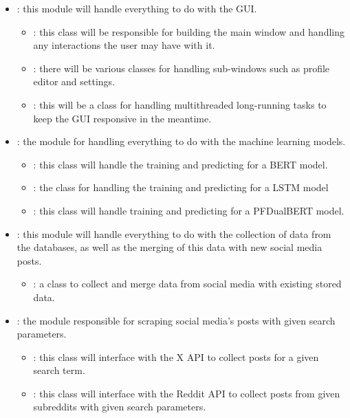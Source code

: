     \begin{itemize}
        \item {}: this module will handle everything to do with the GUI.
        \begin{itemize}
            \item {}: this class will be responsible for building the main window and handling any interactions the user may have with it.
            \item {}: there will be various classes for handling sub-windows such as profile editor and settings.
            \item {}: this will be a class for handling multithreaded long-running tasks to keep the GUI responsive in the meantime.
        \end{itemize}
        \item {}: the module for handling everything to do with the machine learning models.
        \begin{itemize}
            \item {}: this class will handle the training and predicting for a BERT model.
            \item {}: the class for handling the training and predicting for a LSTM model
            \item {}: this class will handle training and predicting for a PFDualBERT model. 
        \end{itemize}
        \item {}: this module will handle everything to do with the collection of data from the databases, as well as the merging of this data with new social media posts.
        \begin{itemize}
            \item {}: a class to collect and merge data from social media with existing stored data.
        \end{itemize}
        \item {}: the module responsible for scraping social media's posts with given search parameters.
        \begin{itemize}
            \item {}: this class will interface with the X API to collect posts for a given search term.
            \item {}: this class will interface with the Reddit API to collect posts from given subreddits with given search parameters.
        \end{itemize}
    \end{itemize}

